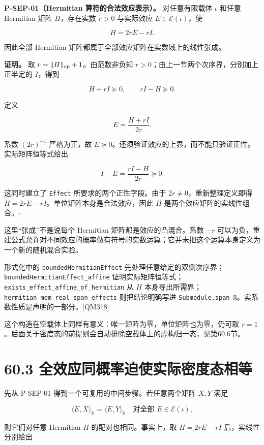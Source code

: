 \documentclass[
  11pt,
  oneside]{book}
\begin{document}
\textbf{P-SEP-01（Hermitian 算符的合法效应表示）。} 对任意有限载体
\(\iota\) 和任意 Hermitian 矩阵 \(H\)，存在实数 \(r>0\) 与实际效应
\(E\in\mathcal E(\iota)\)，使

\[
H=2rE-rI.
\]

因此全部 Hermitian 矩阵都属于全部效应矩阵在实数域上的线性张成。

\textbf{证明。} 取 \(r=\|H\|_{\rm op}+1\)。由范数非负知
\(r>0\)；由上一节两个次序界，分别加上正半定的 \(I\)，得到

\[
H+rI\succeq0,\qquad rI-H\succeq0.
\]

定义

\[
E=\frac{H+rI}{2r}.
\]

系数 \((2r)^{-1}\) 严格为正，故
\(E\succeq0\)。还须验证效应的上界，而不能只验证正性。实际矩阵恒等式给出

\[
I-E=\frac{rI-H}{2r}\succeq0.
\]

这同时建立了 \texttt{Effect} 所要求的两个正性字段。由于
\(2r\ne0\)，重新整理定义即得 \(H=2rE-rI\)。单位矩阵本身是合法效应，因此
\(H\) 是两个效应矩阵的实线性组合。\(\square\)

这里``张成''不是说每个 Hermitian 矩阵都是效应的凸混合。系数 \(-r\)
可以为负，重建公式允许对不同效应的概率做有符号的实数运算；它并未把这个运算本身定义为一个新的随机混合实验。

形式化中的 \texttt{bounded\allowbreak Hermitian\allowbreak Effect}
先处理任意给定的双侧次序界；\texttt{bounded\allowbreak Hermitian\allowbreak Effect\_\allowbreak affine}
证明实际矩阵恒等式；\texttt{exists\_\allowbreak effect\_\allowbreak affine\_\allowbreak of\_\allowbreak hermitian} 从
\(H\) 本身导出所需界；\texttt{hermitian\_\allowbreak mem\_\allowbreak real\_\allowbreak span\_\allowbreak effects}
则把结论明确写进
\texttt{Submodule.\allowbreak span\ ℝ}。实系数性质是声明的一部分。{[}QM318{]}

这个构造在空载体上同样有意义：唯一矩阵为零，单位矩阵也为零，仍可取
\(r=1\)。后面关于密度态的前提则会自动排除空载体上的虚构归一态，见第60.6节。

\section{60.3 全效应同概率迫使实际密度态相等}

先从 P-SEP-01 得到一个可复用的中间步骤。若任意两个矩阵 \(X,Y\) 满足

\[
\langle E,X\rangle_{\mathbb R}
=\langle E,Y\rangle_{\mathbb R}
\quad\text{对全部 }E\in\mathcal E(\iota),
\]

则它们对任意 Hermitian \(H\) 的配对也相同。事实上，取 \(H=2rE-rI\)
后，实线性分别给出
\end{document}
